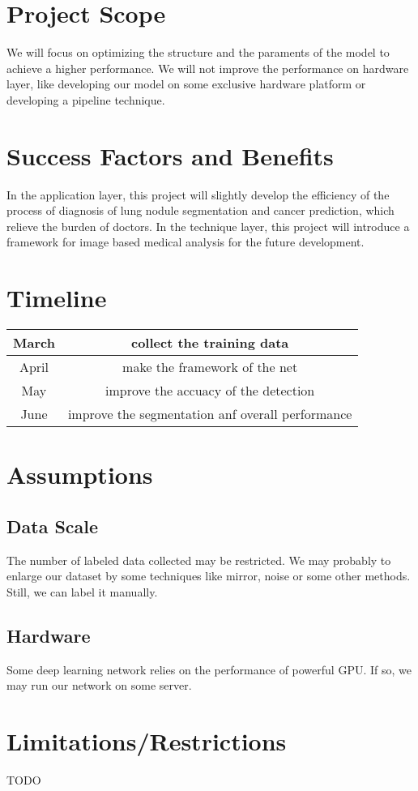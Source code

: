 \documentclass[hyperref]{article}
\theoremstyle{nonumberplain}
\begin{document}
\section{Project Scope}
We will focus on optimizing the structure and the paraments of the model to achieve a higher performance. We will not improve the performance on hardware layer, like developing our model on some exclusive hardware platform or developing a pipeline technique.
\section{Success Factors and Benefits}
In the application layer, this project will slightly develop the efficiency of the process of diagnosis of lung nodule segmentation and cancer prediction, which relieve the burden of doctors. In the technique layer, this project will introduce a framework for image based medical analysis for the future development.
\section{Timeline}
\begin{tabular}{c|c}
March & collect the training data\\
\hline
April & make the framework of the net\\
\hline
May   & improve the accuacy of the detection\\
\hline
June  & improve the segmentation anf overall performance\\
\end{tabular}
\section{Assumptions}
\subsection{Data Scale}
The number of labeled data collected may be restricted. We may probably to enlarge our dataset by some techniques like mirror, noise or some other methods. Still, we can label it manually.
\subsection{Hardware}
Some deep learning network relies on the performance of powerful GPU. If so, we may run our network on some server.
\section{Limitations/Restrictions}
TODO
\end{document}
